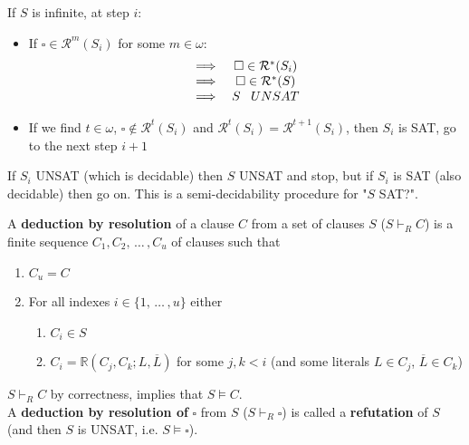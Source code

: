 \newpage

\begin{remark}
	If $S$ is infinite, at step $i$:
	\begin{itemize}
		\item If $\square \in \mathcal{R}^m (S_i)$ for some $m \in \omega$:
		$$ 
		\begin{array}{c c}
			\implies & \square \in \mathcal{R}^\ast (S_i) \\
			\implies & \square \in \mathcal{R}^\ast (S) \\
			\implies & S \;\;\; UNSAT
		\end{array}
		$$
		\item If we find $t \in \omega$, $\square \notin \mathcal{R}^t (S_i)$ and $\mathcal{R}^t (S_i) = \mathcal{R}^{t+1} (S_i)$, then $S_i$ is SAT, go to the next step $i+1$
	\end{itemize} 
	
	If $S_i$ UNSAT (which is decidable) then $S$ UNSAT and stop, but if $S_i$ is SAT (also decidable) then go on. This is a semi-decidability procedure for "$S$ SAT?".\\
\end{remark}


\begin{definition}
	A \textbf{deduction by resolution} of a clause $C$ from a set of clauses $S$ ($S \vdash_R C$) is a finite sequence $C_1, C_2, \, \dots \, , C_u$ of clauses such that
	\begin{enumerate}
		\item $C_u = C$
		\item For all indexes $i \in \{1, \, \dots \, , u\}$ either
		\begin{enumerate}
			\item $C_i \in S$
			\item $C_i = \mathbb{R} (C_j, C_k ; L, \overline L)$ for some $j,k < i$ (and some literals $L \in C_j$, $\overline L \in C_k$) 
		\end{enumerate}
	\end{enumerate}
	\nn
\end{definition}

$S \vdash_R C$ by correctness, implies that $S \models C$.\\

A \textbf{deduction by resolution of} $\square$ from $S$ ($S \vdash_R \square$) is called a \textbf{refutation} of $S$ (and then $S$ is UNSAT, i.e. $S \models \square$).\\

